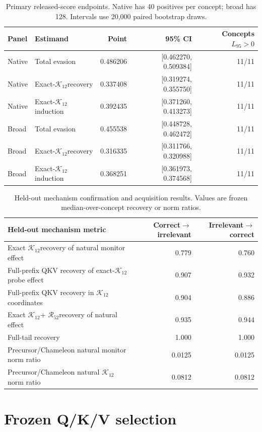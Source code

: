 \documentclass[10pt,twocolumn]{article}
\newcommand{\K}{\ensuremath{\mathcal{K}_{12}}}
\newcommand{\R}{\ensuremath{\mathcal{R}_{52}}}
\begin{document}
\begin{table}[ht]
\centering
\small
\begin{tabular}{llrrr}
\toprule
Panel & Estimand & Point & 95\% CI & Concepts $L_{95}>0$ \\
\midrule
Native & Total evasion & 0.486206 & [0.462270, 0.509384] & 11/11 \\
Native & Exact-\K recovery & 0.337408 & [0.319274, 0.355750] & 11/11 \\
Native & Exact-\K induction & 0.392435 & [0.371260, 0.413273] & 11/11 \\
Broad & Total evasion & 0.455538 & [0.448728, 0.462472] & 11/11 \\
Broad & Exact-\K recovery & 0.316335 & [0.311766, 0.320988] & 11/11 \\
Broad & Exact-\K induction & 0.368251 & [0.361973, 0.374568] & 11/11 \\
\bottomrule
\end{tabular}
\caption{Primary released-score endpoints. Native has 40 positives per concept; broad has 128. Intervals use 20,000 paired bootstrap draws.}
\end{table}

\begin{table}[ht]
\centering
\small
\begin{tabular}{lrr}
\toprule
Held-out mechanism metric & Correct$\rightarrow$irrelevant & Irrelevant$\rightarrow$correct \\
\midrule
Exact \K recovery of natural monitor effect & 0.779 & 0.760 \\
Full-prefix QKV recovery of exact-\K probe effect & 0.907 & 0.932 \\
Full-prefix QKV recovery in \K coordinates & 0.904 & 0.886 \\
Exact \K + \R recovery of natural effect & 0.935 & 0.944 \\
Full-tail recovery & 1.000 & 1.000 \\
Precursor/Chameleon natural monitor norm ratio & 0.0125 & 0.0125 \\
Precursor/Chameleon natural \K norm ratio & 0.0812 & 0.0812 \\
\bottomrule
\end{tabular}
\caption{Held-out mechanism confirmation and acquisition results. Values are frozen median-over-concept recovery or norm ratios.}
\end{table}

\section{Frozen Q/K/V selection}
\end{document}
